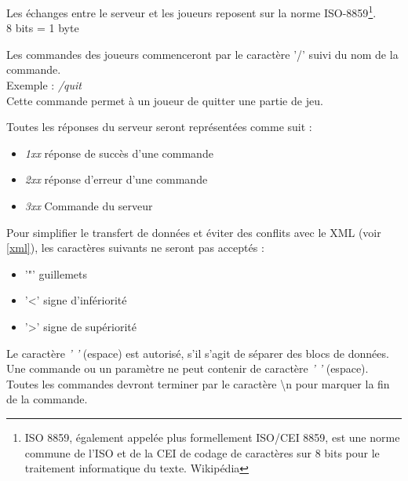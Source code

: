 \par
Les échanges entre le serveur et les joueurs reposent sur la norme ISO-8859\footnote{ISO 8859, également appelée plus formellement ISO/CEI 8859, est une norme commune de l'ISO et de la CEI de codage de caractères sur 8 bits pour le traitement informatique du texte. Wikipédia}. \\

8 bits = 1 byte \\

\par
Les commandes des joueurs commenceront par le caractère '/' suivi du nom de la commande. \\
Exemple : \textit{/quit} \\
Cette commande permet à un joueur de quitter une partie de jeu. \\

\par
Toutes les réponses du serveur seront représentées comme suit : 

\begin{itemize}
	\item \textit{1xx} réponse de succès d'une commande
	\item \textit{2xx} réponse d'erreur d'une commande 
	\item \textit{3xx} Commande du serveur \\
\end{itemize}

\par
Pour simplifier le transfert de données et éviter des conflits avec le XML (voir \ref{xml}), les caractères suivants ne seront pas acceptés : 

\begin{itemize}
	\item '"' guillemets
	\item '<' signe d'infériorité
	\item '>' signe de supériorité \\
\end{itemize}

Le caractère \textit{' '} (espace) est autorisé, s'il s'agit de séparer des blocs de données. Une commande ou un paramètre ne peut contenir de caractère \textit{' '} (espace). \\

Toutes les commandes devront terminer par le caractère \textbackslash n pour marquer la fin de la commande.